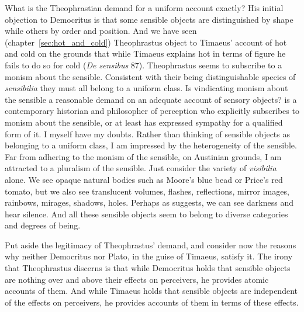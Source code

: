 What is the Theophrastian demand for a uniform account exactly? His initial objection to Democritus is that some sensible objects are distinguished by shape while others by order and position. And we have seen (chapter~\ref{sec:hot_and_cold}) Theophrastus object to Timaeus' account of hot and cold on the grounds that while Timaeus explains hot in terms of figure he fails to do so for cold (\emph{De sensibus} 87). Theophrastus seems to subscribe to a monism about the sensible. Consistent with their being distinguishable species of \emph{sensibilia} they must all belong to a uniform class. Is vindicating monism about the sensible a reasonable demand on an adequate account of sensory objects? \citet{Pasnau:1999ss,Pasnau:2000aa} is a contemporary historian and philosopher of perception who explicitly subscribes to monism about the sensible, or at least has expressed sympathy for a qualified form of it. I myself have my doubts. Rather than thinking of sensible objects as belonging to a uniform class, I am impressed by the heterogeneity of the sensible. Far from adhering to the monism of the sensible, on Austinian grounds, I am attracted to a pluralism of the sensible. Just consider the variety of \emph{visibilia} alone. We see opaque natural bodies such as Moore's \citeyearpar{Moore:1903uo} blue bead or Price's \citeyearpar{Price:1932fk} red tomato, but we also see translucent volumes, flashes, reflections, mirror images, rainbows, mirages, shadows, holes. Perhaps as \citet{Sorensen:2004jk,Sorensen:2008kx,Sorensen:2009aa} suggests, we can see darkness and hear silence. And all these sensible objects seem to belong to diverse categories and degrees of being. 

Put aside the legitimacy of Theophrastus' demand, and consider now the reasons why neither Democritus nor Plato, in the guise of Timaeus, satisfy it. The irony that Theophrastus discerns is that while Democritus holds that sensible objects are nothing over and above their effects on perceivers, he provides atomic accounts of them. And while Timaeus holds that sensible objects are independent of the effects on perceivers, he provides accounts of them in terms of these effects.


